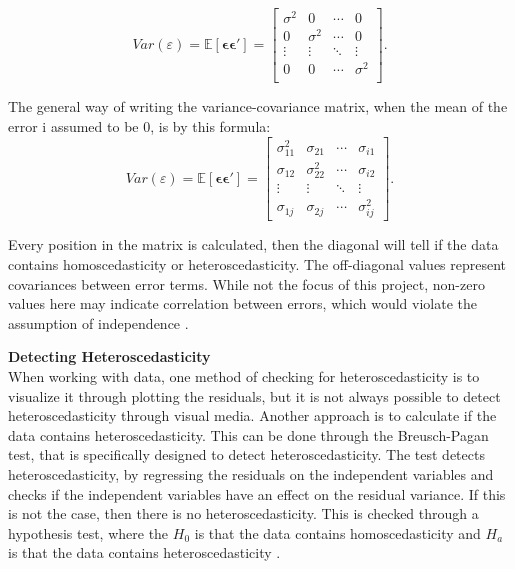 	
\begin{equation}
Var(\varepsilon) = \mathbb{E}[\boldsymbol{\epsilon} \boldsymbol{\epsilon}'] = 
\left[
\begin{array}{cccc}
	\sigma^2 & 0        & \cdots & 0 \\
	0        & \sigma^2 & \cdots & 0 \\
	\vdots   & \vdots   & \ddots & \vdots \\
	0        & 0        & \cdots & \sigma^2 \\
\end{array}
\right].
\end{equation}


\noindent The general way of writing the variance-covariance matrix, when the mean of the error i assumed to be $0$, is by this formula:
\begin{equation}
Var(\varepsilon) = \mathbb{E}[\boldsymbol{\epsilon} \boldsymbol{\epsilon}'] = 
\left[
\begin{array}{cccc}
	\sigma^2_{11} & \sigma_{21} & \cdots & \sigma_{i1} \\
	\sigma_{12} & \sigma^2_{22} & \cdots & \sigma_{i2} \\
	\vdots      & \vdots      & \ddots & \vdots      \\
	\sigma_{1j} & \sigma_{2j} & \cdots & \sigma^2_{ij}
\end{array}
\right].
\end{equation}

\noindent Every position in the matrix is calculated, then the diagonal will tell if the data contains homoscedasticity or heteroscedasticity. The off-diagonal values represent covariances between error terms. While not the focus of this project, non-zero values here may indicate correlation between errors, which would violate the assumption of independence \cite{Heteroscedasticity} . \newline 

\noindent \textbf{Detecting Heteroscedasticity} \\
When working with data, one method of checking for heteroscedasticity is to visualize it through plotting the residuals, but it is not always possible to detect heteroscedasticity through visual media. Another approach is to calculate if the data contains heteroscedasticity. This can be done through the Breusch-Pagan test, that is specifically designed to detect heteroscedasticity. The test detects heteroscedasticity, by regressing the residuals on the independent variables and checks if the independent variables have an effect on the residual variance. If this is not the case, then there is no heteroscedasticity. This is checked through a hypothesis test, where the $H_0$ is that the data contains homoscedasticity and $H_a$ is that the data contains heteroscedasticity \cite{HomoSce}. \newline

